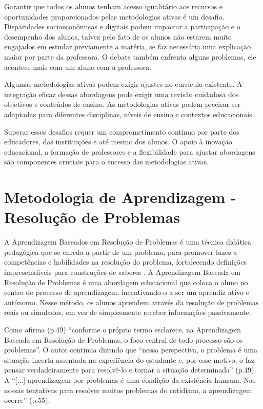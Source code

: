 Garantir que todos os alunos tenham acesso igualitário aos recursos e oportunidades proporcionados pelas metodologias ativas é um desafio. Disparidades socioeconômicas e digitais podem impactar a participação e o desempenho dos alunos, talvez pelo fato de os alunos não estarem muito engajados em estudar previamente a matéria, se faz necessária uma explicação maior por parte da professora. O debate também enfrenta alguns problemas, ele acontece mais com um aluno com a professora.

Algumas metodologias ativas podem exigir ajustes no currículo existente. A integração eficaz dessas abordagens pode exigir uma revisão cuidadosa dos objetivos e conteúdos de ensino. As metodologias ativas podem precisar ser adaptadas para diferentes disciplinas, níveis de ensino e contextos educacionais.

Superar esses desafios requer um comprometimento contínuo por parte dos educadores, das instituições e até mesmo dos alunos. O apoio à inovação educacional, a formação de professores e a flexibilidade para ajustar abordagens são componentes cruciais para o sucesso das metodologias ativas.

\section{Metodologia de Aprendizagem - Resolução de Problemas}

A Aprendizagem Baseados em Resolução de Problemas é uma técnica didática pedagógica que se enreda a partir de um problema, para promover luzes a competências e habilidades na resolução do problema, fortalecendo definições imprescindíveis para construções de saberes \cite{SILVA-LINS-LEAO2019}. A Aprendizagem Baseada em Resolução de Problemas é uma abordagem educacional que coloca o aluno no centro do processo de aprendizagem, incentivando-o a ser um aprendiz ativo e autônomo. Nesse método, os alunos aprendem através da resolução de problemas reais ou simulados, em vez de simplesmente receber informações passivamente.

Como afirma  (p.49) ``conforme o próprio termo esclarece, na Aprendizagem Baseada em Resolução de Problemas, o foco central de todo processo são os problemas''. O autor continua dizendo que ``nessa perspectiva, o problema é uma situação incerta assentada na experiência do estudante e, por esse motivo, o faz pensar verdadeiramente para resolvê-lo e tornar a situação determinada'' (p.49). A ``[...] aprendizagem por problemas é uma condição da existência humana. Nas nossas tentativas para resolver muitos problemas do cotidiano, a aprendizagem ocorre'' \cite{SOUZA2016} (p.55).

